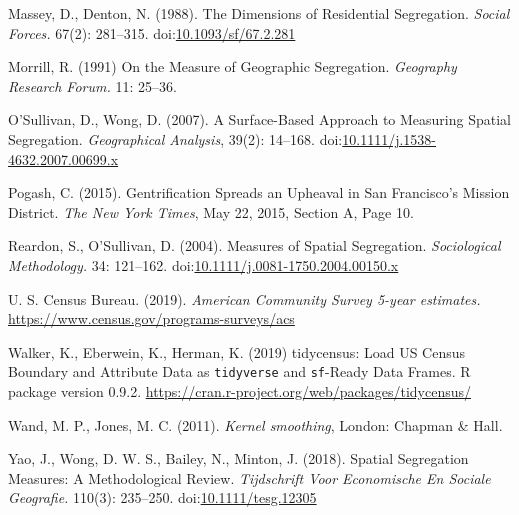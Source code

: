 \documentclass{article}
\theoremstyle{theorem}
\theoremstyle{definition}
\begin{document}
\begin{thebibliography}{3}
 Massey, D., Denton, N. (1988). The Dimensions of Residential Segregation. \textit{Social Forces.} 67(2): 281--315. doi:\href{http://dx.doi.org/10.1093/sf/67.2.281}{10.1093/sf/67.2.281}

 Morrill, R. (1991) On the Measure of Geographic Segregation. \textit{Geography Research Forum.} 11: 25--36.

 O'Sullivan, D., Wong, D. (2007). A Surface-Based Approach to Measuring Spatial Segregation. \textit{Geographical Analysis}, 39(2): 14--168. doi:\href{http://dx.doi.org/10.1111/j.1538-4632.2007.00699.x}{10.1111/j.1538-4632.2007.00699.x}

Pogash, C. (2015). Gentrification Spreads an Upheaval in San Francisco's Mission District. \textit{The New York Times}, May 22, 2015, Section A, Page 10.

Reardon, S., O'Sullivan, D. (2004). Measures of Spatial Segregation. \textit{Sociological Methodology.} 34: 121--162. doi:\href{http://dx.doi.org/10.1111/j.0081-1750.2004.00150.x}{10.1111/j.0081-1750.2004.00150.x}

 U. S. Census Bureau. (2019). \textit{American Community Survey 5-year estimates.} \href{https://www.census.gov/programs-surveys/acs}{\url{https://www.census.gov/programs-surveys/acs}}

 Walker, K., Eberwein, K., Herman, K. (2019) tidycensus: Load US Census Boundary and Attribute Data as \texttt{tidyverse} and \texttt{sf}-Ready Data Frames. R package version 0.9.2. \href{https://cran.r-project.org/web/packages/tidycensus}{\url{https://cran.r-project.org/web/packages/tidycensus/}}

 Wand, M. P., Jones, M. C. (2011). \textit{Kernel smoothing}, London: Chapman \& Hall.

 Yao, J., Wong, D. W. S., Bailey, N., Minton, J. (2018). Spatial Segregation Measures: A Methodological Review. \textit{Tijdschrift Voor Economische En Sociale Geografie.} 110(3): 235--250. doi:\href{https://doi.org/10.1111/tesg.12305}{10.1111/tesg.12305}

\end{thebibliography}
\end{document}
